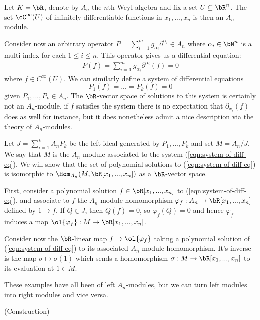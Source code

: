 \begin{example}\label{example:d-mod-differential-equation}
	Let $K = \bR$, denote by $A_n$ the $n$th Weyl algebra and fix a set $U \subseteq \bR^n$. The set $\cC^\infty(U)$ of infinitely differentiable functions in $x_1,...,x_n$ is then an $A_n$ module.

	Consider now an arbitrary operator $P = \sum_{i=1}^m g_{\alpha_i} \partial^{\alpha_i} \in A_n$ where $\alpha_i \in \bN^n$ is a multi-index for each $1\leq i\leq n$. This operator gives us a differential equation:
	\begin{align*}
		P(f) = \sum_{i=1}^m g_{\alpha_i}\partial^{\alpha_i}(f) = 0
	\end{align*}
	where $f \in C^\infty(U)$. We can similarly define a system of differential equations
	\begin{equation}\label{eqn:system-of-diff-eq}
		P_1(f) = ... = P_k(f) = 0
	\end{equation}
	given $P_1,...,P_k \in A_n$. The $\bR$-vector space of solutions to this system is certainly not an $A_n$-module, if $f$ satisfies the system there is no expectation that $\partial_{x_i}(f)$ does as well for instance, but it does nonetheless admit a nice description via the theory of $A_n$-modules.

	Let $J = \sum_{i=1}^k A_nP_k$ be the left ideal generated by $P_1,...,P_k$ and set $M = A_n/J$. We say that $M$ is the $A_n$-module associated to the system (\ref{eqn:system-of-diff-eq}). We will show that the set of polynomial solutions to (\ref{eqn:system-of-diff-eq}) is isomorphic to $\Hom_{A_n}(M,\bR[x_1,...,x_n])$ as a $\bR$-vector space.

	First, consider a polynomial solution $f \in \bR[x_1,...,x_n]$ to (\ref{eqn:system-of-diff-eq}), and associate to $f$ the $A_n$-module homomorphism $\varphi_f:A_n\to \bR[x_1,...,x_n]$ defined by $1 \mapsto f$. If $Q \in J$, then $Q(f) = 0$, so $\varphi_f(Q) = 0$ and hence $\varphi_f$ induces a map $\ol{\varphi_f}:M\to\bR[x_1,...,x_n]$.

	Consider now the $\bR$-linear map $f\mapsto \ol{\varphi_f}$ taking a polynomial solution of (\ref{eqn:system-of-diff-eq}) to its associated $A_n$-module homomorphism. It's inverse is the map $\sigma \mapsto \sigma(1)$ which sends a homomorphism $\sigma:M\to \bR[x_1,...,x_n]$ to its evaluation at $1 \in M$.
\end{example}

These examples have all been of left $A_n$-modules, but we can turn left modules into right modules and vice versa. 
\begin{example}(Construction)\label{example:d-mod-left-to-right}
	
\end{example}

